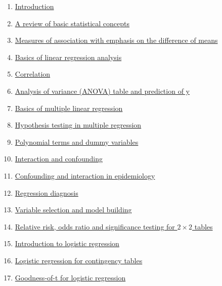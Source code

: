 \documentclass[11pt]{article}
\begin{document}
\vspace{-0.5cm}

\begin{enumerate}
	\item \href{https://mp.weixin.qq.com/s/N0s4MzC-yqU62RPQhlZD9g}{Introduction}	%
	\item \href{https://mp.weixin.qq.com/s/m8eDodRly7lg8-zd5Ymnuw}{A review of basic statistical concepts}	%
	\item \href{https://mp.weixin.qq.com/s/z1mv6IcWT5Z1CadNaOTjPQ}{Measures of association with emphasis on the difference of means}	%
	\item \href{https://mp.weixin.qq.com/s/VTkyub7i56Hus-l-tpWeQg}{Basics of linear regression analysis}	%
	\item \href{https://mp.weixin.qq.com/s/4CbCGjDRJoP3rryc-Wl9-w}{Correlation}	%
	\item \href{https://mp.weixin.qq.com/s/DEOhiwFAioMzjSJjIEhR3Q}{Analysis of variance (ANOVA) table and prediction of y}	%
	\item \href{https://mp.weixin.qq.com/s/ZIDIKZRxSsaSvFkjqQobnA}{Basics of multiple linear regression}	%
	\item \href{https://mp.weixin.qq.com/s/Nu8Y0nP6FABLg2KFGBRkIQ}{Hypothesis testing in multiple regression}	%
	\item \href{https://mp.weixin.qq.com/s/n2mPgIg4XmiSMfkqawibpg}{Polynomial terms and dummy variables}	%
	\item \href{https://mp.weixin.qq.com/s/pvamkehlfc8zGa04Qqhk9w}{Interaction and confounding}	%
	\item \href{https://mp.weixin.qq.com/s/czwjRLwL_mwVNm6yheSq0Q}{Confounding and interaction in epidemiology}	%
	\item \href{https://mp.weixin.qq.com/s/AMgRjZx9Y0SZheSiylzSzA}{Regression diagnosis}	%
	\item \href{https://mp.weixin.qq.com/s/H83huuxKMA2rA7g39pPZSA}{Variable selection and model building}	%
	\item \href{https://mp.weixin.qq.com/s/Kc6j--5MFG1YaXt_SmGcpQ}{Relative risk, odds ratio and significance testing for $2\times2$ tables}	%
	\item \href{https://mp.weixin.qq.com/s/g5J2QapsGMW-brSHjEvYLw}{Introduction to logistic regression}	%
	\item \href{https://mp.weixin.qq.com/s/Xi4XcT5KNnzvZdKBWK7_Jw}{Logistic regression for contingency tables}	%
	\item \href{https://mp.weixin.qq.com/s/VbYZZsbz-Hy0BD1jK-NKUQ}{Goodness-of-t for logistic regression}	%

\end{enumerate}
\end{document}
